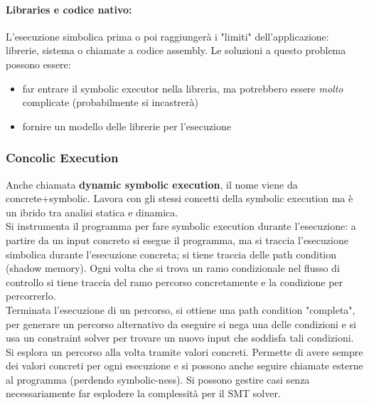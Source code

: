 \paragraph{Libraries e codice nativo:} L'esecuzione simbolica prima o poi raggiungerà i "limiti" dell'applicazione: librerie, sistema o chiamate a codice assembly. Le soluzioni a questo problema possono essere: 
\begin{itemize}
	\item far entrare il symbolic executor nella libreria, ma potrebbero essere \textit{molto} complicate (probabilmente si incastrerà)
	\item fornire un modello delle librerie per l'esecuzione
\end{itemize}

\newpage

\subsubsection{Concolic Execution}

Anche chiamata \textbf{dynamic symbolic execution}, il nome viene da concrete+symbolic. Lavora con gli stessi concetti della symbolic execution ma è un ibrido tra analisi statica e dinamica. \\

Si instrumenta il programma per fare symbolic execution durante l'esecuzione: a partire da un input concreto si esegue il programma, ma si traccia l'esecuzione simbolica durante l'esecuzione concreta; si tiene traccia delle path condition (shadow memory). Ogni volta che si trova un ramo condizionale nel flusso di controllo si tiene traccia del ramo percorso concretamente e la condizione per percorrerlo.\\

Terminata l'esecuzione di un percorso, si ottiene una path condition "completa", per generare un percorso alternativo da eseguire si nega una delle condizioni e si usa un constraint solver per trovare un nuovo input che soddisfa tali condizioni.\\

Si esplora un percorso alla volta tramite valori concreti. Permette di avere sempre dei valori concreti per ogni esecuzione e si possono anche seguire chiamate esterne al programma (perdendo symbolic-ness). Si possono gestire casi senza necessariamente far esplodere la complessità per il SMT solver.\\

